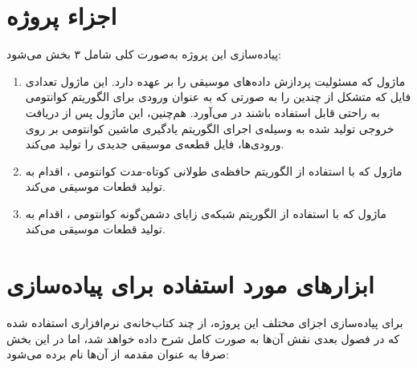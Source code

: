 \section{اجزاء پروژه} \label{sec:parts}
پیاده‌سازی این پروژه به‌صورت کلی شامل ۳ بخش می‌شود:
\begin{enumerate}
    \item ماژول
    که مسئولیت پردازش داده‌های موسیقی را بر عهده دارد. این ماژول تعدادی فایل که متشکل از چندین  را به صورتی که به عنوان ورودی برای الگوریتم کوانتومی به راحتی قابل استفاده باشند در می‌آورد. هم‌چنین، این ماژول پس از دریافت خروجی تولید شده به وسیله‌ی اجرای الگوریتم یادگیری ماشین کوانتومی بر روی ورودی‌ها، فایل قطعه‌ی موسیقی جدیدی را تولید می‌کند.
    \item ماژول
    که با استفاده از الگوریتم حافظه‌ی طولانی کوتاه-مدت کوانتومی
    \cite{chen_qlstm}
    ، اقدام به تولید قطعات موسیقی می‌کند.
    
    \item ماژول
    که با استفاده از الگوریتم شبکه‌ی زایای دشمن‌گونه کوانتومی
    \cite{lloyd_qugan} \cite{zoufal_qugan}
    ، اقدام به تولید قطعات موسیقی می‌کند.

\end{enumerate}

\section{ابزارهای مورد استفاده برای پیاده‌سازی}

برای پیاده‌سازی اجزای مختلف این پروژه، از چند کتاب‌خانه‌ی نرم‌افزاری استفاده شده که در فصول بعدی نقش آن‌ها به صورت کامل شرح داده خواهد شد، اما در این بخش صرفا به عنوان مقدمه از آن‌ها نام برده می‌شود:
